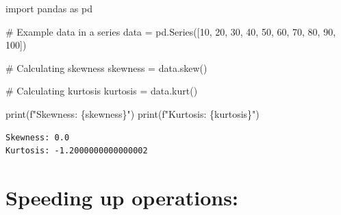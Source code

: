 \documentclass[
  english,
  letterpaper,
  DIV=11,
  numbers=noendperiod]{scrreprt}
\newenvironment{Shaded}{\begin{snugshade}}{\end{snugshade}}
\newcommand{\BuiltInTok}[1]{\textcolor[rgb]{0.00,0.23,0.31}{#1}}
\newcommand{\CommentTok}[1]{\textcolor[rgb]{0.37,0.37,0.37}{#1}}
\newcommand{\DecValTok}[1]{\textcolor[rgb]{0.68,0.00,0.00}{#1}}
\newcommand{\ImportTok}[1]{\textcolor[rgb]{0.00,0.46,0.62}{#1}}
\newcommand{\NormalTok}[1]{\textcolor[rgb]{0.00,0.23,0.31}{#1}}
\newcommand{\OperatorTok}[1]{\textcolor[rgb]{0.37,0.37,0.37}{#1}}
\newcommand{\SpecialCharTok}[1]{\textcolor[rgb]{0.37,0.37,0.37}{#1}}
\newcommand{\SpecialStringTok}[1]{\textcolor[rgb]{0.13,0.47,0.30}{#1}}
\begin{document}
\begin{Shaded}
\begin{Highlighting}[]
\ImportTok{import}\NormalTok{ pandas }\ImportTok{as}\NormalTok{ pd}

\CommentTok{\# Example data in a series}
\NormalTok{data }\OperatorTok{=}\NormalTok{ pd.Series([}\DecValTok{10}\NormalTok{, }\DecValTok{20}\NormalTok{, }\DecValTok{30}\NormalTok{, }\DecValTok{40}\NormalTok{, }\DecValTok{50}\NormalTok{, }\DecValTok{60}\NormalTok{, }\DecValTok{70}\NormalTok{, }\DecValTok{80}\NormalTok{, }\DecValTok{90}\NormalTok{, }\DecValTok{100}\NormalTok{])}

\CommentTok{\# Calculating skewness}
\NormalTok{skewness }\OperatorTok{=}\NormalTok{ data.skew()}

\CommentTok{\# Calculating kurtosis}
\NormalTok{kurtosis }\OperatorTok{=}\NormalTok{ data.kurt()}

\BuiltInTok{print}\NormalTok{(}\SpecialStringTok{f"Skewness: }\SpecialCharTok{\{}\NormalTok{skewness}\SpecialCharTok{\}}\SpecialStringTok{"}\NormalTok{)}
\BuiltInTok{print}\NormalTok{(}\SpecialStringTok{f"Kurtosis: }\SpecialCharTok{\{}\NormalTok{kurtosis}\SpecialCharTok{\}}\SpecialStringTok{"}\NormalTok{)}
\end{Highlighting}
\end{Shaded}

\begin{verbatim}
Skewness: 0.0
Kurtosis: -1.2000000000000002
\end{verbatim}

\section{Speeding up operations:}\label{speeding-up-operations}
\end{document}

